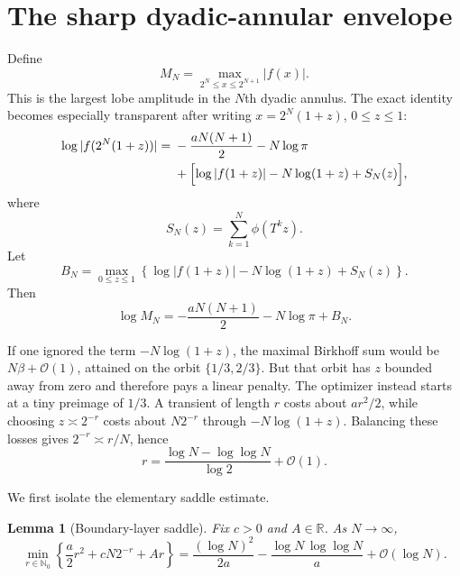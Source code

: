 \documentclass[11pt,oneside]{article}
\newtheorem{lemma}[theorem]{Lemma}
\theoremstyle{definition}
\theoremstyle{remark}
\newcommand{\R}{\mathbb R}
\newcommand{\N}{\mathbb N}
\newcommand{\bigO}{\mathcal O}
\newcommand{\T}{T}
\begin{document}
\section{The sharp dyadic-annular envelope}
\label{sec:envelope}

Define
\begin{equation}
 M_N=\max_{2^N\le x\le2^{N+1}}|f(x)|.                       \label{eq:MN}
\end{equation}
This is the largest lobe amplitude in the $N$th dyadic annulus.  The exact
identity becomes especially transparent after writing
$x=2^N(1+z)$, $0\le z\le1$:
\begin{equation}
 \begin{split}
 \log|f(2^N(1+z))|
 ={}&-\frac{aN(N+1)}2-N\log\pi\\
 &+\Bigl[\log|f(1+z)|-N\log(1+z)+S_N(z)\Bigr],             \label{eq:annular-exact}
 \end{split}
\end{equation}
where
\begin{equation}
 S_N(z)=\sum_{k=1}^{N}\phi(\T^kz).                         \label{eq:SNplus}
\end{equation}
Let
\begin{equation}
 B_N=\max_{0\le z\le1}
 \left\{\log|f(1+z)|-N\log(1+z)+S_N(z)\right\}.           \label{eq:BN}
\end{equation}
Then
\begin{equation}
 \log M_N=-\frac{aN(N+1)}2-N\log\pi+B_N.                  \label{eq:M-B}
\end{equation}

If one ignored the term $-N\log(1+z)$, the maximal Birkhoff sum would be
$N\beta+\bigO(1)$, attained on the orbit $\{1/3,2/3\}$.  But that orbit has
$z$ bounded away from zero and therefore pays a linear penalty.  The optimizer
instead starts at a tiny preimage of $1/3$.  A transient of length $r$ costs
about $ar^2/2$, while choosing $z\asymp2^{-r}$ costs about $N2^{-r}$ through
$-N\log(1+z)$.  Balancing these losses gives
$2^{-r}\asymp r/N$, hence
\begin{equation}
 r=\frac{\log N-\log\log N}{\log2}+\bigO(1).               \label{eq:r-opt}
\end{equation}

We first isolate the elementary saddle estimate.

\begin{lemma}[Boundary-layer saddle]
Fix $c>0$ and $A\in\R$.  As $N\to\infty$,
\begin{equation}
 \min_{r\in\N_0}
 \left\{\frac a2r^2+cN2^{-r}+Ar\right\}
 =\frac{(\log N)^2}{2a}
  -\frac{\log N\,\log\log N}{a}
  +\bigO(\log N).                                          \label{eq:saddle-lemma}
\end{equation}
\end{lemma}
\end{document}
